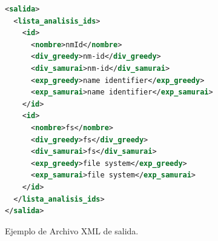 \begin{appendices}
\enlargethispage{\baselineskip}%
\enlargethispage{\baselineskip}
\enlargethispage{\baselineskip}
\enlargethispage{\baselineskip}
\enlargethispage{\baselineskip}

\begin{figure}[h!]
\begin{lstlisting}[language=xml, frame=single]
<salida>
  <lista_analisis_ids>
    <id>
      <nombre>nmId</nombre>
      <div_greedy>nm-id</div_greedy>
      <div_samurai>nm-id</div_samurai>
      <exp_greedy>name identifier</exp_greedy>
      <exp_samurai>name identifier</exp_samurai>
    </id> 
    <id>
      <nombre>fs</nombre>
      <div_greedy>fs</div_greedy>
      <div_samurai>fs</div_samurai>
      <exp_greedy>file system</exp_greedy>
      <exp_samurai>file system</exp_samurai>
    </id>         
  </lista_analisis_ids>
</salida>
\end{lstlisting}
\caption{Ejemplo de Archivo XML de salida.}
\label{xml2}
\end{figure}

\end{appendices}


